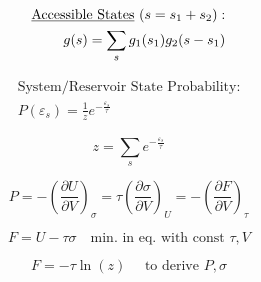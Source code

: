 \documentclass[12pt]{article}
\begin{document}
\begin{multicols}{2}

  \begin{equation*}
    \begin{split}
      \text{\underline{Accessible States} } (s=s_1+s_2):\\
      g(s)=\sum_s g_1(s_1)g_2(s-s_1)
    \end{split}
  \end{equation*}
    
  \begin{equation*}
    \begin{split}
      \text{System/Reservoir State Probability:}\\
      P(\varepsilon_s)=\frac{1}{z}e^{-\frac{\varepsilon_s}{\tau}}
    \end{split}
  \end{equation*}

\end{multicols}

\vspace{-30pt}

\begin{multicols}{2}

  \begin{equation*}
    z=\sum_s e^{-\frac{\varepsilon_s}{\tau}}
  \end{equation*}
    
  \begin{equation*}
    P=-\left( \frac{\partial U}{\partial V} \right)_\sigma=\tau\left( \frac{\partial\sigma}{\partial V} \right)_U=-\left( \frac{\partial F}{\partial V} \right)_\tau
  \end{equation*}

\end{multicols}

\vspace{-30pt}

\begin{multicols}{2}

  \begin{equation*}
    F=U-\tau\sigma\quad\text{min. in eq. with const } \tau,V
  \end{equation*}

  \begin{equation*}
    F=-\tau\ln(z)\quad\text{ to derive }P,\sigma
  \end{equation*}

\end{multicols}

\vspace{5pt}
\end{document}
